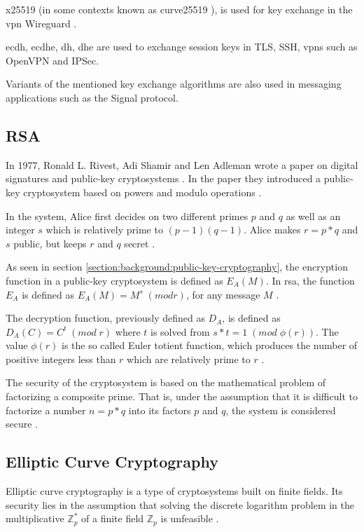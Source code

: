 \gls{x25519} (in some contexts known as \gls{curve25519} \cite{25519naming}), is used for key exchange in the \gls{vpn} Wireguard \cite{wireguard2020}.

\gls{ecdh}, \gls{ecdhe}, \gls{dh}, \gls{dhe} are used to exchange session keys in TLS\cite{rfc8446}, SSH\cite{williams2011}, \glspl{vpn} such as OpenVPN \cite{openvpn} and IPSec\cite{rfc2409}.

Variants of the mentioned key exchange algorithms are also used in messaging applications such as the Signal protocol\cite{gordon2017}.

\subsection{RSA}

In 1977, Ronald L. Rivest, Adi Shamir and Len Adleman wrote a paper on digital signatures and public-key cryptosystems \cite{rsa1977}. In the paper they introduced a public-key cryptosystem based on powers and modulo operations \cite{rsa1977}.

In the system, Alice first decides on two different primes $p$ and $q$ as well as an integer $s$ which is relatively prime to $(p-1)(q-1)$. Alice makes $r=p*q$ and $s$ public, but keeps $r$ and $q$ secret \cite{rsa1977}.

As seen in section \ref{section:background:public-key-cryptography}, the encryption function in a public-key cryptosystem is defined as $E_A(M)$. In \gls{rsa}, the function $E_A$ is defined as $E_A(M)=M^s\;(mod r)$, for any message $M$ \cite{rsa1977}.

The decryption function, previously defined as $D_A$, is defined as $D_A(C)=C^t\;(mod\;r)$ where $t$ is solved from $s*t=1\;(mod\;\phi(r))$. The value $\phi(r)$ is the so called Euler totient function, which produces the number of positive integers less than $r$ which are relatively prime to $r$ \cite{rsa1977}.

The security of the cryptosystem is based on the mathematical problem of factorizing a composite prime. That is, under the assumption that it is difficult to factorize a number $n=p*q$ into its factors $p$ and $q$, the system is considered secure \cite{rsa1977}.

\subsection{Elliptic Curve Cryptography}

Elliptic curve cryptography is a type of cryptosystems built on finite fields. Its security lies in the assumption that solving the discrete logarithm problem in the multiplicative $\mathbb{Z}_p^*$ of a finite field $\mathbb{Z}_p$ is unfeasible \cite{delfs2007}.

